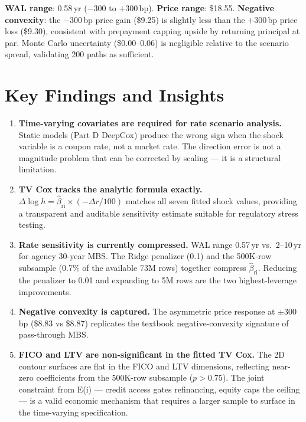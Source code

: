 \documentclass[11pt,a4paper]{article}
\begin{document}
\textbf{WAL range}: 0.58\,yr ($-300$ to $+300$\,bp). \textbf{Price range}: \$18.55.
\textbf{Negative convexity}: the $-300$\,bp price gain (\$9.25) is slightly less than
the $+300$\,bp price loss (\$9.30), consistent with prepayment capping upside by
returning principal at par. Monte Carlo uncertainty (\$0.00--0.06) is negligible
relative to the scenario spread, validating 200 paths as sufficient.

\section{Key Findings and Insights}

\begin{enumerate}[leftmargin=1.6em,itemsep=3pt]

  \item \textbf{Time-varying covariates are required for rate scenario analysis.}
        Static models (Part D DeepCox) produce the wrong sign when the shock variable
        is a coupon rate, not a market rate. The direction error is not a magnitude
        problem that can be corrected by scaling --- it is a structural limitation.

  \item \textbf{TV Cox tracks the analytic formula exactly.}
        $\Delta\log h = \hat\beta_{\text{ri}} \times (-\Delta r/100)$ matches all seven
        fitted shock values, providing a transparent and auditable sensitivity estimate
        suitable for regulatory stress testing.

  \item \textbf{Rate sensitivity is currently compressed.}
        WAL range 0.57\,yr vs.\ 2--10\,yr for agency 30-year MBS. The Ridge penalizer
        (0.1) and the 500K-row subsample (0.7\% of the available 73M rows) together
        compress $\hat\beta_{\text{ri}}$. Reducing the penalizer to 0.01 and expanding
        to 5M rows are the two highest-leverage improvements.

  \item \textbf{Negative convexity is captured.}
        The asymmetric price response at $\pm 300$\,bp (\$8.83 vs \$8.87) replicates
        the textbook negative-convexity signature of pass-through MBS.

  \item \textbf{FICO and LTV are non-significant in the fitted TV Cox.}
        The 2D contour surfaces are flat in the FICO and LTV dimensions, reflecting
        near-zero coefficients from the 500K-row subsample ($p>0.75$). The joint
        constraint from E(i) --- credit access gates refinancing, equity caps the ceiling
        --- is a valid economic mechanism that requires a larger sample to surface in
        the time-varying specification.

\end{enumerate}
\end{document}
